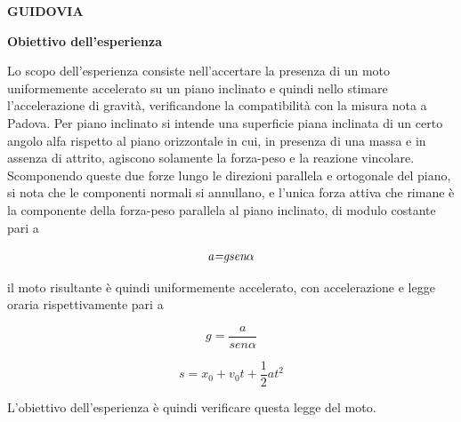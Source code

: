 \documentclass[a4paper,11pt,titlepage]{book}
\begin{document}
\begin{LARGE}
\begin{center}
\textbf{GUIDOVIA}
\end{center}
\end{LARGE}
\vspace*{1cm}
\begin{center}
\textbf{{\large Obiettivo dell'esperienza}} 
\end{center}
\vspace{0.15cm}
\begin{flushleft}
Lo scopo dell’esperienza consiste nell’accertare la presenza di un moto uniformemente accelerato su un piano inclinato e quindi nello stimare l’accelerazione di gravità, verificandone la compatibilità con la misura nota a Padova. 
Per piano inclinato si intende una superficie piana inclinata di un certo angolo alfa rispetto al piano orizzontale in cui, in presenza di una massa e in assenza di attrito, agiscono solamente la forza-peso e la reazione vincolare. Scomponendo queste due forze lungo le direzioni parallela e ortogonale del piano, si nota che le componenti normali si annullano, e l’unica forza attiva che rimane è la componente della forza-peso parallela al piano inclinato, di modulo costante pari a
\end{flushleft}
\begin{center}
\begin{equation}
\emph{a=gsen$\alpha$}
\end{equation}
\end{center}


\begin{flushleft}
 il moto risultante è quindi uniformemente accelerato, con accelerazione e legge oraria rispettivamente pari a
 \end{flushleft} 
 
 
\begin{center}
\begin{equation}
g=\dfrac{a}{sen{\alpha}}
\end{equation}
\end{center}

\begin{center}
\begin{equation}
s=x_0+{v_0}t+{\dfrac{1}{2}}a{t}^2
\end{equation}
\end{center}
\begin{flushleft}
L’obiettivo dell’esperienza è quindi verificare questa legge del moto.
\end{flushleft}
\vspace{0.1cm}
\end{document}
